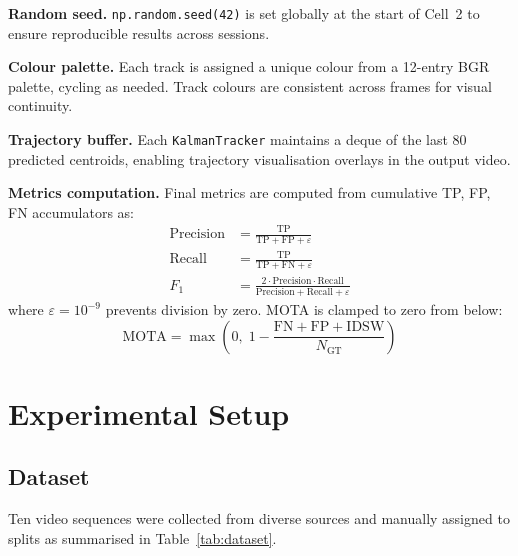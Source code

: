 \documentclass[10pt, conference, compsocconf]{IEEEtran}
\begin{document}
\textbf{Random seed.} \texttt{np.random.seed(42)} is set globally
at the start of Cell~2 to ensure reproducible results across sessions.

\textbf{Colour palette.} Each track is assigned a unique colour from
a 12-entry BGR palette, cycling as needed. Track colours are
consistent across frames for visual continuity.

\textbf{Trajectory buffer.} Each \texttt{KalmanTracker} maintains a
deque of the last 80 predicted centroids, enabling trajectory
visualisation overlays in the output video.

\textbf{Metrics computation.} Final metrics are computed from
cumulative TP, FP, FN accumulators as:
\begin{align}
  \text{Precision} &= \frac{\text{TP}}{\text{TP}+\text{FP}+\varepsilon} \\
  \text{Recall}    &= \frac{\text{TP}}{\text{TP}+\text{FN}+\varepsilon} \\
  F_1              &= \frac{2 \cdot \text{Precision} \cdot \text{Recall}}
                          {\text{Precision}+\text{Recall}+\varepsilon}
\end{align}
where $\varepsilon = 10^{-9}$ prevents division by zero. MOTA is
clamped to zero from below:
\begin{equation}
  \text{MOTA} = \max\!\left(0,\;
  1 - \frac{\text{FN}+\text{FP}+\text{IDSW}}{N_\text{GT}}\right)
  \label{eq:mota}
\end{equation}

\section{Experimental Setup}

\subsection{Dataset}
Ten video sequences were collected from diverse sources and
manually assigned to splits as summarised in Table~\ref{tab:dataset}.
\end{document}
